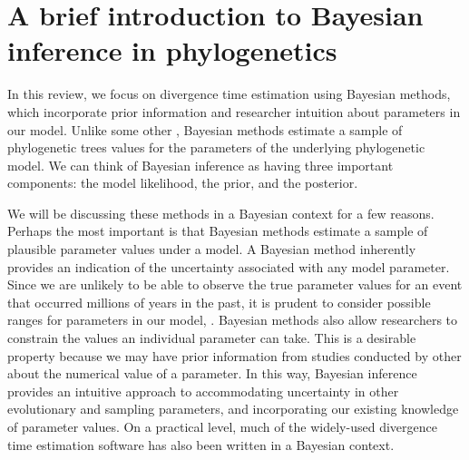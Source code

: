 
\section{A brief introduction to Bayesian inference in phylogenetics}


In this review, we focus on divergence time estimation using Bayesian methods, which incorporate prior information and researcher intuition about parameters in our model.
Unlike some other , Bayesian methods estimate a sample of phylogenetic trees  values for the parameters of the underlying phylogenetic model.
We can think of Bayesian inference as having three important components: the model likelihood, the prior, and the posterior.

We will be discussing these methods in a Bayesian context for a few reasons.
Perhaps the most important is that Bayesian methods estimate a sample of plausible parameter values under a model.
A Bayesian method inherently provides an indication of the uncertainty associated with any model parameter.
Since we are unlikely to be able to observe the true parameter values for an event that occurred millions of years in the past, it is prudent to consider possible ranges for parameters in our model, .
Bayesian methods also allow researchers to constrain the values an individual parameter can take.
This is a desirable property because we may have prior information from studies conducted by other  about the numerical value of a parameter.
In this way, Bayesian inference provides an intuitive approach to accommodating uncertainty in other evolutionary and sampling parameters, and incorporating our existing knowledge of parameter values.
On a practical level, much of the widely-used divergence time estimation software has also been written in a Bayesian context.


